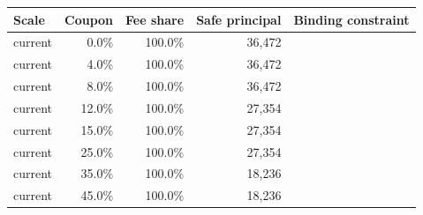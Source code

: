 \begingroup
\small
\setlength{\tabcolsep}{3pt}
\begin{tabular}{lrrrr}
\toprule
Scale & Coupon & Fee share & Safe principal & Binding constraint \\
\midrule
current & 0.0\% & 100.0\% & 36,472 &  \\
current & 4.0\% & 100.0\% & 36,472 &  \\
current & 8.0\% & 100.0\% & 36,472 &  \\
current & 12.0\% & 100.0\% & 27,354 &  \\
current & 15.0\% & 100.0\% & 27,354 &  \\
current & 25.0\% & 100.0\% & 27,354 &  \\
current & 35.0\% & 100.0\% & 18,236 &  \\
current & 45.0\% & 100.0\% & 18,236 &  \\
\bottomrule
\end{tabular}
\endgroup
